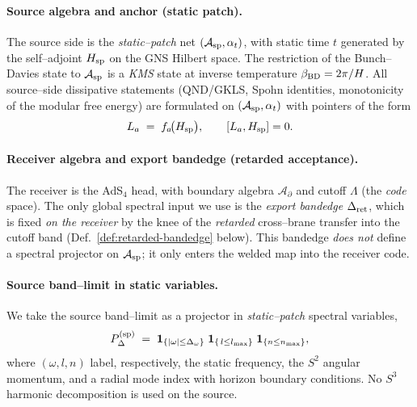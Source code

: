 \documentclass[10pt]{article}
\theoremstyle{definition}
\theoremstyle{plain}
\begin{document}
\paragraph{Source algebra and anchor (static patch).}\label{par:uom-main-005}
The source side is the \emph{static–patch} net $(\mathcal A_{\rm sp},\alpha_t)$, with static time $t$ generated by
the self–adjoint $H_{\rm sp}$ on the GNS Hilbert space. The restriction of the Bunch–Davies state to
$\mathcal A_{\rm sp}$ is a \emph{KMS} state at inverse temperature $\beta_{\rm BD}=2\pi/H$.
All source–side dissipative statements (QND/GKLS, Spohn identities, monotonicity of the modular free energy)
are formulated on $(\mathcal A_{\rm sp},\alpha_t)$ with pointers of the form
\[
L_a \;=\; f_a\!\big(H_{\rm sp}\big),
\qquad [L_a,H_{\rm sp}] = 0.
\]

\paragraph{Receiver algebra and export bandedge (retarded acceptance).}\label{par:uom-main-006}
The receiver is the AdS$_4$ head, with boundary algebra $\mathcal A_\partial$ and cutoff $\Lambda$
(the \emph{code} space). The only global spectral input we use is the \emph{export bandedge}
$\Delta_{\rm ret}$, which is fixed \emph{on the receiver} by the knee of the \emph{retarded} cross–brane
transfer into the cutoff band (Def.~\ref{def:retarded-bandedge} below). This bandedge \emph{does not}
define a spectral projector on $\mathcal A_{\rm sp}$; it only enters the welded map into the receiver code.

\paragraph{Source band–limit in static variables.}\label{par:uom-main-007}
We take the source band–limit as a projector in \emph{static–patch} spectral variables,
\begin{equation}
\label{eq:sp-band-projector}
P^{\rm(sp)}_\Delta \;=\;
\mathbf 1_{\{|\omega|\le \Delta_\omega\}}\;\mathbf 1_{\{\,l\le l_{\max}\}}\;\mathbf 1_{\{n\le n_{\max}\}},
\end{equation}
where $(\omega,l,n)$ label, respectively, the static frequency, the $S^2$ angular momentum,
and a radial mode index with horizon boundary conditions. No $S^3$ harmonic decomposition is used on the source.
\end{document}
